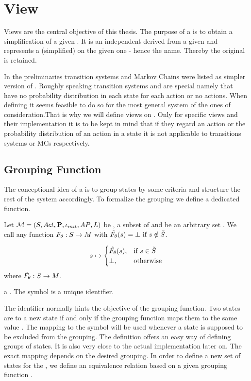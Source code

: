 \documentclass[preview]{standalone}
\begin{document}
	
\section{View}
Views are the central objective of this thesis. The purpose of a \viewN is to obtain a simplification of a given \chgphN.  It is an independent \chgphN derived from a given \chgphN and represents a (simplified) \viewN on the given one - hence the name. Thereby the original \chgphN is retained.

In the preliminaries transition systems and Markov Chains were listed as simpler version of \mdpsN. Roughly speaking transition systems and \mdpsN are special \mdpsN namely that have no probability distribution in each state for each action or no actions. When defining \viewsN it seems feasible to do so for the most general system of the ones of consideration.That is why we will define views on \mdpsN. Only for specific views and their implementation it is to be kept in mind that if they regard an action or the probability distribution of an action in a state it is not applicable to transitions systems or MCs respectively. 

\subsection{Grouping Function}
The conceptional idea of a \viewN is to group states by some criteria and structure the rest of the system accordingly. To formalize the grouping we define a dedicated function.

\begin{definition}
	Let ${{{\mathcal{M}}}} = {{({S}, {Act}, {\textbf{P}}, {\iota_{init}}, {AP}, {L})}}$ be \chgphN, \smstates a subset of \states and \arbset be an arbitrary set . We call any function ${F_{{\theta}}} : {S} \to {\ensuremath{{M}}}$ with
	$\tilde\grpfct(s) = \remelem \text{ if } \state \notin \smstates$.
	
	
	\[
	\state \mapsto
	\begin{cases}
		\tilde\grpfct(s),				& \text{if } \state \in \smstates \\ 		\remelem,          	& \text{otherwise}
	\end{cases}
	\]
	where $\tilde\grpfct : \states \to \imggrp$.
	
	a \emph{\grpfctN}. The symbol \viewppty is a unique identifier.
	
	\label{def:grpfct}
\end{definition}

The identifier \viewppty normally hints the objective of the grouping function. Two states are  to a new state if and only if the grouping function maps them to the same value . The mapping to the symbol \remelem will be used whenever a state is supposed to be excluded from the grouping. The definition offers an easy way of defining groups of states. It is also very close to the actual implementation later on. The exact mapping depends on the desired grouping. In order to define a new set of states for the \viewN, we define an equivalence relation \eqrelview based on a given grouping function \grpfct.
\end{document}
